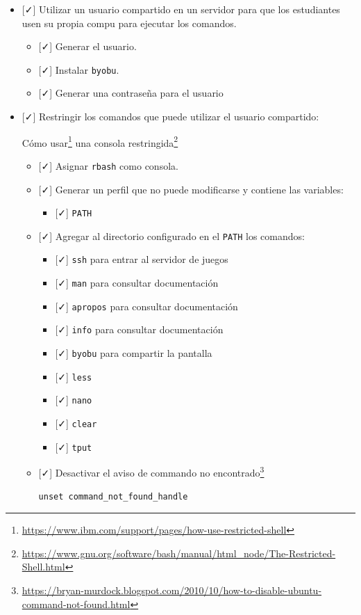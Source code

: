 \documentclass[
  12,
]{scrartcl}
\DeclareRobustCommand{\href}[2]{#2\footnote{\url{#1}}}
\providecommand{\tightlist}{%
  \setlength{\itemsep}{0pt}\setlength{\parskip}{0pt}}
\begin{document}
\begin{itemize}
\item
  {[}✓{]} Utilizar un usuario compartido en un servidor para que los
  estudiantes usen su propia compu para ejecutar los comandos.

  \begin{itemize}
  \tightlist
  \item
    {[}✓{]} Generar el usuario.
  \item
    {[}✓{]} Instalar \texttt{byobu}.
  \item
    {[}✓{]} Generar una contraseña para el usuario
  \end{itemize}
\item
  {[}✓{]} Restringir los comandos que puede utilizar el usuario
  compartido:

  \href{https://www.ibm.com/support/pages/how-use-restricted-shell}{Cómo
  usar} una
  \href{https://www.gnu.org/software/bash/manual/html_node/The-Restricted-Shell.html}{consola
  restringida}

  \begin{itemize}
  \item
    {[}✓{]} Asignar \texttt{rbash} como consola.
  \item
    {[}✓{]} Generar un perfil que no puede modificarse y contiene las
    variables:

    \begin{itemize}
    \tightlist
    \item
      {[}✓{]} \texttt{PATH}
    \end{itemize}
  \item
    {[}✓{]} Agregar al directorio configurado en el \texttt{PATH} los
    comandos:

    \begin{itemize}
    \tightlist
    \item
      {[}✓{]} \texttt{ssh} para entrar al servidor de juegos
    \item
      {[}✓{]} \texttt{man} para consultar documentación
    \item
      {[}✓{]} \texttt{apropos} para consultar documentación
    \item
      {[}✓{]} \texttt{info} para consultar documentación
    \item
      {[}✓{]} \texttt{byobu} para compartir la pantalla
    \item
      {[}✓{]} \texttt{less}
    \item
      {[}✓{]} \texttt{nano}
    \item
      {[}✓{]} \texttt{clear}
    \item
      {[}✓{]} \texttt{tput}
    \end{itemize}
  \item
    {[}✓{]}
    \href{https://bryan-murdock.blogspot.com/2010/10/how-to-disable-ubuntu-command-not-found.html}{Desactivar
    el aviso de commando no encontrado}

\begin{verbatim}
unset command_not_found_handle
\end{verbatim}
  \end{itemize}
\end{itemize}
\end{document}

